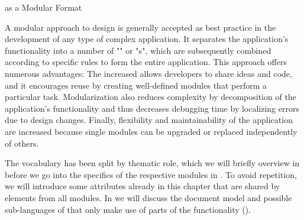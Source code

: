 \begin{omgroup}[id=spec-intro.modular]{\omdoc as a Modular Format}

A modular approach to design is generally accepted as best practice in the development of
any type of complex application. It separates the application's functionality into a
number of "{}" or "{s}", which are subsequently
combined according to specific rules to form the entire application. This approach offers
numerous advantages: The increased {} allows developers to
share ideas and code, and it encourages reuse by creating well-defined modules that
perform a particular task. Modularization also reduces complexity by decomposition of the
application's functionality and thus decreases debugging time by localizing errors due to
design changes. Finally, flexibility and maintainability of the application are increased
because single modules can be upgraded or replaced independently of others.

The \omdoc vocabulary has been split by thematic role, which we will briefly overview in
{} before we go into the specifics of the respective modules in
{}. To avoid repetition, we will introduce some attributes already in
this chapter that are shared by elements from all modules. In  we
will discuss the \omdoc document model and possible sub-languages of \omdoc that only
make use of parts of the functionality ().


\end{omgroup}
